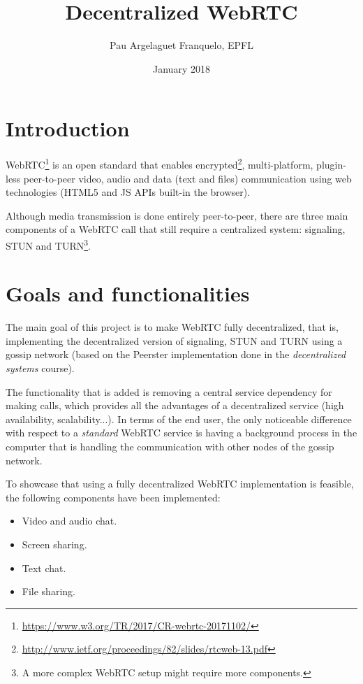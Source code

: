 \documentclass[paper=a4, fontsize=11pt]{scrartcl} %
\title{	
\normalfont
\huge Decentralized WebRTC \\
}
\author{Pau Argelaguet Franquelo, EPFL}
\date{\normalsize January 2018}
\numberwithin{equation}{section} %
\numberwithin{figure}{section} %
\numberwithin{table}{section} %
\begin{document}
\maketitle %

\section{Introduction}

WebRTC\footnote{\url{https://www.w3.org/TR/2017/CR-webrtc-20171102/}} is an open standard that enables encrypted\footnote{\url{http://www.ietf.org/proceedings/82/slides/rtcweb-13.pdf}}, multi-platform, plugin-less peer-to-peer video, audio and data (text and files) communication using web technologies (HTML5 and JS APIs built-in the browser). 

Although media transmission is done entirely peer-to-peer, there are three main components of a WebRTC call that still require a centralized system: signaling, STUN and TURN\footnote{A more complex WebRTC setup might require more components.}.

\section{Goals and functionalities}

The main goal of this project is to make WebRTC fully decentralized, that is, implementing the decentralized version of signaling, STUN and TURN using a gossip network (based on the Peerster implementation done in the \textit{decentralized systems} course). 

The functionality that is added is removing a central service dependency for making calls, which provides all the advantages of a decentralized service (high availability, scalability...). In terms of the end user, the only noticeable difference with respect to a \textit{standard} WebRTC service is having a background process in the computer that is handling the communication with other nodes of the gossip network.

To showcase that using a fully decentralized WebRTC implementation is feasible, the following components have been implemented:

\begin{itemize}
	\item Video and audio chat.
	\item Screen sharing.
	\item Text chat.
	\item File sharing.
\end{itemize}
\end{document}
